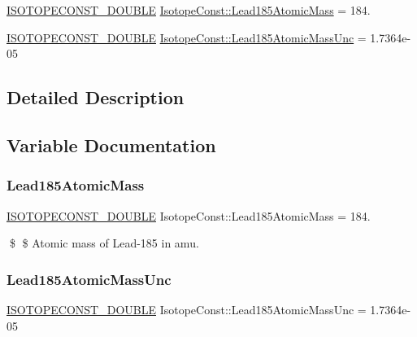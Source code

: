 \begin{DoxyCompactItemize}
\item 
\mbox{\hyperlink{group___isotope_const-_macros_ga8f45a7272ce02c0b4c65c44636ed719a}{I\+S\+O\+T\+O\+P\+E\+C\+O\+N\+S\+T\+\_\+\+D\+O\+U\+B\+LE}} \mbox{\hyperlink{group___isotope_const-_lead-_pb185_ga6089d7cf38efb259022809fb04ac8afd}{Isotope\+Const\+::\+Lead185\+Atomic\+Mass}} = 184.
\item 
\mbox{\hyperlink{group___isotope_const-_macros_ga8f45a7272ce02c0b4c65c44636ed719a}{I\+S\+O\+T\+O\+P\+E\+C\+O\+N\+S\+T\+\_\+\+D\+O\+U\+B\+LE}} \mbox{\hyperlink{group___isotope_const-_lead-_pb185_ga7a3a4109db99e4169b09191fd01959f4}{Isotope\+Const\+::\+Lead185\+Atomic\+Mass\+Unc}} = 1.\+7364e-\/05
\end{DoxyCompactItemize}


\subsection{Detailed Description}


\subsection{Variable Documentation}
\mbox{\label{group___isotope_const-_lead-_pb185_ga6089d7cf38efb259022809fb04ac8afd}} 
\subsubsection{\texorpdfstring{Lead185\+Atomic\+Mass}{Lead185AtomicMass}}
{\footnotesize\ttfamily \mbox{\hyperlink{group___isotope_const-_macros_ga8f45a7272ce02c0b4c65c44636ed719a}{I\+S\+O\+T\+O\+P\+E\+C\+O\+N\+S\+T\+\_\+\+D\+O\+U\+B\+LE}} Isotope\+Const\+::\+Lead185\+Atomic\+Mass = 184.}

\$ \$ Atomic mass of Lead-\/185 in amu. \mbox{\label{group___isotope_const-_lead-_pb185_ga7a3a4109db99e4169b09191fd01959f4}} 
\subsubsection{\texorpdfstring{Lead185\+Atomic\+Mass\+Unc}{Lead185AtomicMassUnc}}
{\footnotesize\ttfamily \mbox{\hyperlink{group___isotope_const-_macros_ga8f45a7272ce02c0b4c65c44636ed719a}{I\+S\+O\+T\+O\+P\+E\+C\+O\+N\+S\+T\+\_\+\+D\+O\+U\+B\+LE}} Isotope\+Const\+::\+Lead185\+Atomic\+Mass\+Unc = 1.\+7364e-\/05}

